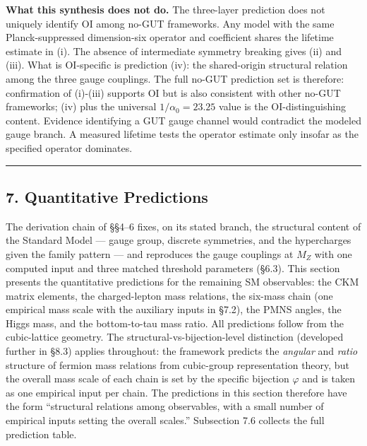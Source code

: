 \documentclass[
]{article}
\begin{document}
\textbf{What this synthesis does not do.} The three-layer prediction
does not uniquely identify OI among no-GUT frameworks. Any model with
the same Planck-suppressed dimension-six operator and coefficient shares
the lifetime estimate in (i). The absence of intermediate symmetry
breaking gives (ii) and (iii). What is OI-specific is prediction (iv):
the shared-origin structural relation among the three gauge couplings.
The full no-GUT prediction set is therefore: confirmation of (i)-(iii)
supports OI but is also consistent with other no-GUT frameworks; (iv)
plus the universal \(1/\alpha_0 = 23.25\) value is the OI-distinguishing
content. Evidence identifying a GUT gauge channel would contradict the
modeled gauge branch. A measured lifetime tests the operator estimate
only insofar as the specified operator dominates.

\begin{center}\rule{0.5\linewidth}{0.5pt}\end{center}

\hypertarget{quantitative-predictions}{%
\subsection{7. Quantitative
Predictions}\label{quantitative-predictions}}

The derivation chain of §§4--6 fixes, on its stated branch, the
structural content of the Standard Model --- gauge group, discrete
symmetries, and the hypercharges given the family pattern --- and
reproduces the gauge couplings at \(M_Z\) with one computed input and
three matched threshold parameters (§6.3). This section presents the
quantitative predictions for the remaining SM observables: the CKM
matrix elements, the charged-lepton mass relations, the six-mass chain
(one empirical mass scale with the auxiliary inputs in §7.2), the PMNS
angles, the Higgs mass, and the bottom-to-tau mass ratio. All
predictions follow from the cubic-lattice geometry. The
structural-vs-bijection-level distinction (developed further in §8.3)
applies throughout: the framework predicts the \emph{angular} and
\emph{ratio} structure of fermion mass relations from cubic-group
representation theory, but the overall mass scale of each chain is set
by the specific bijection \(\varphi\) and is taken as one empirical
input per chain. The predictions in this section therefore have the form
``structural relations among observables, with a small number of
empirical inputs setting the overall scales.'' Subsection 7.6 collects
the full prediction table.
\end{document}
